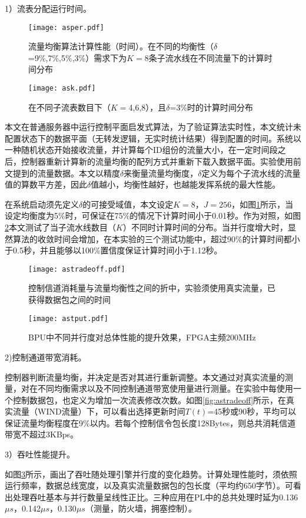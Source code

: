 1）流表分配运行时间。

\begin{figure}[!ht]
	\centering 
	\texttt{[image: asper.pdf]}
	\caption{流量均衡算法计算性能（时间）。在不同的均衡性（$\delta$=9\%,7\%,5\%,3\%）需求下为$K=8$条子流水线在不同流量下的计算时间分布} \label{fig:asper}
\end{figure}

\begin{figure}[!ht]
	\centering 
	\texttt{[image: ask.pdf]}
	\caption{在不同子流表数目下（$K=$4,6,8），且$\delta$=3\%时的计算时间分布} \label{fig:ask}
\end{figure}

本文在普通服务器中运行控制平面启发式算法，为了验证算法实时性，本文统计未配置状态下的数据平面（无转发逻辑，无实时统计结果）得到配置的时间。系统以一种随机状态开始接收流量，并计算每个ID组份的流量大小，在一定时间段之后，控制器重新计算新的流量均衡的配列方式并重新下载入数据平面。实验使用前文提到的流量数据。本文以精度$\delta$来衡量流量均衡度，$\delta$定义为每个子流水线的流量值的算数平方差，因此$\delta$值越小，均衡性越好，也越能发挥系统的最大性能。

在系统启动须先定义$\delta$的可接受域值，本文设定$K=8$，$ J=256$，如图\ref{fig:asper}所示，当设定均衡度为5\%时，可保证在75\%的情况下计算时间小于0.01秒。作为对照，如图\ref{fig:ask}本文测试了当子流水线数目（$K$）不同时计算时间的分布。当并行度增大时，显然算法的收敛时间会增加，在本实验的三个测试功能中，超过90\%的计算时间都小于0.5秒，并且能够以100\%置信度保证计算时间小于1.12秒。

\begin{figure}[htbp]
	\centering
	\begin{minipage}[t]{0.48\textwidth}
		\centering
		\texttt{[image: astradeoff.pdf]}
		\caption{控制信道消耗量与流量均衡性之间的折中，实验须使用真实流量，已获得数据包之间的时间} \label{fig:astradeoff}
	\end{minipage}
	\begin{minipage}[t]{0.48\textwidth}
		\centering
		\texttt{[image: astput.pdf]}
		\caption{BPU中不同并行度对总体性能的提升效果，FPGA主频200MHz} \label{fig:astput}
	\end{minipage}
\end{figure}



2)控制通道带宽消耗。

控制器判断流量均衡，并决定是否对其进行重新调整。本文通过对真实流量的测量，对在不同均衡需求以及不同控制通道带宽使用量进行测量。在实验中每使用一个控制数据包，也定义为增加一次流表修改次数。如图\ref{fig:astradeoff}所示，在真实流量（WIND流量）下，可以看出选择更新时间$ T(t) $=45秒或90秒，平均可以保证流量均衡程度在9\%以内。若每个控制信令包长度128Bytes，则总共消耗信道带宽不超过3KBps。





3）吞吐性能提升。



如图\ref{fig:astput}所示，画出了吞吐随处理引擎并行度的变化趋势。计算处理性能时，须依照运行频率，数据总线宽度，以及真实流量数据包的包长度（平均约650字节）。可看出处理吞吐基本与并行数量呈线性正比。三种应用在PL中的总共处理时延为0.136$ \mu s $，0.142$ \mu s $，0.130$ \mu s $（测量，防火墙，拥塞控制）。








